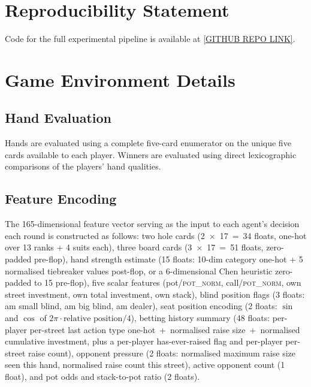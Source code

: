 \documentclass{article}
\begin{document}
\printbibliography


\appendix

\section{Reproducibility Statement}
Code for the full experimental pipeline is available at \url{[GITHUB REPO LINK]}.

\section{Game Environment Details} \label{app:env}

\subsection{Hand Evaluation}
Hands are evaluated using a complete five-card enumerator on the unique five cards available to each player. Winners are evaluated using direct lexicographic comparisons of the players' hand qualities.

\subsection{Feature Encoding}

The 165-dimensional feature vector serving as the input to each agent's decision each round is constructed as follows: two hole cards (2~$\times$~17~=~34 floats, one-hot over 13 ranks + 4 suits each), three board cards (3~$\times$~17~=~51 floats, zero-padded pre-flop), hand strength estimate (15 floats: 10-dim category one-hot + 5 normalised tiebreaker values post-flop, or a 6-dimensional Chen heuristic zero-padded to 15 pre-flop), five scalar features (pot/\textsc{pot\_norm}, call/\textsc{pot\_norm}, own street investment, own total investment, own stack), blind position flags (3 floats: am small blind, am big blind, am dealer), seat position encoding (2 floats: $\sin$ and $\cos$ of $2\pi \cdot \text{relative position} / 4$), betting history summary (48 floats: per-player per-street last action type one-hot~+~normalised raise size~+~normalised cumulative investment, plus a per-player has-ever-raised flag and per-player per-street raise count), opponent pressure (2 floats: normalised maximum raise size seen this hand, normalised raise count this street), active opponent count (1 float), and pot odds and stack-to-pot ratio (2 floats).
\end{document}
